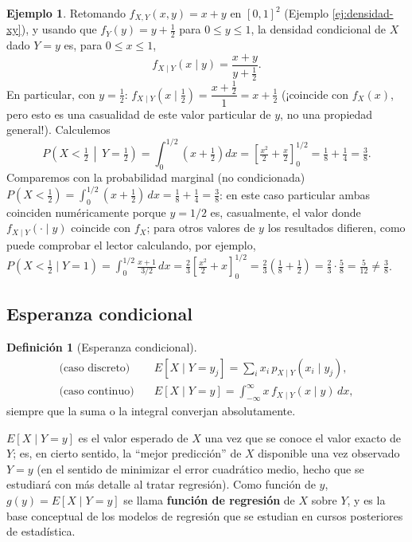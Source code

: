 \documentclass[11pt,a4paper]{article}
\theoremstyle{plain}
\theoremstyle{definition}
\newtheorem{definicion}[teorema]{Definición}
\newtheorem{ejemplo}[teorema]{Ejemplo}
\theoremstyle{remark}
\begin{document}
\begin{ejemplo}\label{ej:condicional-continua}
Retomando $f_{X,Y}(x,y)=x+y$ en $[0,1]^2$ (Ejemplo \ref{ej:densidad-xy}), y usando que $f_Y(y)=y+\tfrac12$ para $0\le y\le1$, la densidad condicional de $X$ dado $Y=y$ es, para $0\le x\le1$,
\[
f_{X\mid Y}(x\mid y) = \frac{x+y}{y+\tfrac12}.
\]
En particular, con $y=\tfrac12$: $f_{X\mid Y}(x\mid\tfrac12) = \dfrac{x+\tfrac12}{1}=x+\tfrac12$ (¡coincide con $f_X(x)$, pero esto es una casualidad de este valor particular de $y$, no una propiedad general!). Calculemos
\[
P\left(X<\tfrac12\,\middle|\,Y=\tfrac12\right) = \int_0^{1/2}\left(x+\tfrac12\right)dx = \left[\tfrac{x^2}{2}+\tfrac{x}{2}\right]_0^{1/2} = \tfrac18+\tfrac14=\tfrac38.
\]
Comparemos con la probabilidad marginal (no condicionada) $P(X<\tfrac12) = \int_0^{1/2}(x+\tfrac12)\,dx = \tfrac18+\tfrac14=\tfrac38$: en este caso particular ambas coinciden numéricamente porque $y=1/2$ es, casualmente, el valor donde $f_{X\mid Y}(\cdot\mid y)$ coincide con $f_X$; para otros valores de $y$ los resultados difieren, como puede comprobar el lector calculando, por ejemplo, $P(X<\tfrac12\mid Y=1) = \int_0^{1/2}\frac{x+1}{3/2}\,dx = \frac{2}{3}\left[\frac{x^2}{2}+x\right]_0^{1/2} = \frac23\left(\frac18+\frac12\right)=\frac{2}{3}\cdot\frac58=\frac{5}{12}\ne\frac38$.
\end{ejemplo}

\subsection{Esperanza condicional}

\begin{definicion}[Esperanza condicional]
\begin{align*}
\text{(caso discreto)}\quad & E[X\mid Y=y_j] = \sum_i x_i\, p_{X\mid Y}(x_i\mid y_j), \\
\text{(caso continuo)}\quad & E[X\mid Y=y] = \int_{-\infty}^{\infty} x\, f_{X\mid Y}(x\mid y)\,dx,
\end{align*}
siempre que la suma o la integral converjan absolutamente.
\end{definicion}

$E[X\mid Y=y]$ es el valor esperado de $X$ una vez que se conoce el valor exacto de $Y$; es, en cierto sentido, la ``mejor predicción'' de $X$ disponible una vez observado $Y=y$ (en el sentido de minimizar el error cuadrático medio, hecho que se estudiará con más detalle al tratar regresión). Como función de $y$, $g(y)=E[X\mid Y=y]$ se llama \textbf{función de regresión} de $X$ sobre $Y$, y es la base conceptual de los modelos de regresión que se estudian en cursos posteriores de estadística.
\end{document}
